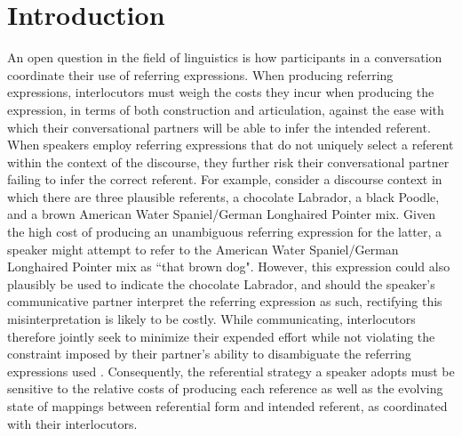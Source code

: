 \documentclass[12pt,a4paper]{article}
\begin{document}
\section{Introduction}
An open question in the field of linguistics is how participants in a conversation coordinate their use of referring expressions. When producing referring expressions, interlocutors must weigh the costs they incur when producing the expression, in terms of both construction and articulation, against the ease with which their conversational partners will be able to infer the intended referent. When speakers employ referring expressions that do not uniquely select a referent within the context of the discourse, they further risk their conversational partner failing to infer the correct referent. For example, consider a discourse context in which there are three plausible referents, a chocolate Labrador, a black Poodle, and a brown American Water Spaniel/German Longhaired Pointer mix. Given the high cost of producing an unambiguous referring expression for the latter, a speaker might attempt to refer to the American Water Spaniel/German Longhaired Pointer mix as ``that brown dog". However, this expression could also plausibly be used to indicate the chocolate Labrador, and should the speaker's communicative partner interpret the referring expression as such, rectifying this misinterpretation is likely to be costly. While communicating, interlocutors therefore jointly seek to minimize their expended effort while not violating the constraint imposed by their partner's ability to disambiguate the referring expressions used \citep[p.~65-66]{benz2005}. Consequently, the referential strategy a speaker adopts must be sensitive to the relative costs of producing each reference as well as the evolving state of mappings between referential form and intended referent, as coordinated with their interlocutors. 
\end{document}
